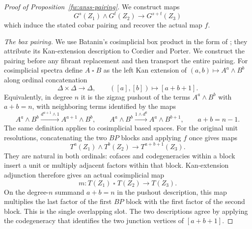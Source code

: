 \begin{proof}[Proof of Proposition~\ref{fw:anss-pairing}]
We construct maps
\[
 G^s(Z_1)\wedge G^t(Z_2)\longrightarrow G^{s+t}(Z_3)
\]
which induce the stated cobar pairing and recover the actual map $f$.

\smallskip\noindent\emph{The box pairing.}
We use Batanin's cosimplicial box product in the form of
\citet[Definition~2.1, Proposition~2.3, and Remark~2.4]{McClureSmith2004};
they attribute its Kan-extension description to Cordier and Porter.
We construct the pairing before any fibrant replacement and then transport
the entire pairing. For cosimplicial spectra define $A\mathbin\square B$
as the left Kan extension of $(a,b)\mapsto A^a\wedge B^b$ along ordinal
concatenation
\[
 \Delta\times\Delta\longrightarrow\Delta,
 \qquad([a],[b])\longmapsto[a+b+1].
\]
Equivalently, in degree $n$ it is the zigzag pushout of the terms
$A^a\wedge B^b$ with $a+b=n$, with neighboring terms identified by
the maps
\[
 A^a\wedge B^b\xrightarrow{d^{a+1}\wedge1}
 A^{a+1}\wedge B^b,
 \qquad
 A^a\wedge B^b\xrightarrow{1\wedge d^0}
 A^a\wedge B^{b+1},
 \qquad a+b=n-1.
\]
The same definition applies to cosimplicial based spaces.
For the original unit resolutions, concatenating the two $BP$ blocks
and applying $f$ once gives maps
\[
 T^a(Z_1)\wedge T^b(Z_2)\longrightarrow T^{a+b+1}(Z_3).
\]
They are natural in both ordinals: cofaces and codegeneracies within a
block insert a unit or multiply adjacent factors within that block.
Kan-extension adjunction therefore gives an actual cosimplicial map
\begin{equation}
 m:T(Z_1)\mathbin\square T(Z_2)\longrightarrow T(Z_3).
 \label{fw:original-box-pairing}
\end{equation}
On the degree-$n$ summand $a+b=n$ in the pushout description, this map
multiplies the last factor of the first $BP$ block with the first factor
of the second block.  This is the single overlapping slot.  The two
descriptions agree by applying the codegeneracy that identifies the
two junction vertices of $[a+b+1]$.


\end{proof}
